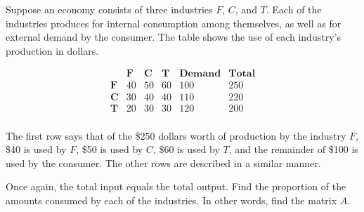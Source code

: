 \begin{example}
    Suppose an economy consists of three industries \( F \), \( C \), and \( T \). Each of the industries produces for internal consumption among themselves, as well as for external demand by the consumer. The table shows the use of each industry's production in dollars.

    \[
        \begin{array}{cccccc}
            \textbf{ } & \textbf{F} & \textbf{C} & \textbf{T} & \textbf{Demand} & \textbf{Total} \\
            \textbf{F} & 40         & 50         & 60         & 100             & 250            \\
            \textbf{C} & 30         & 40         & 40         & 110             & 220            \\
            \textbf{T} & 20         & 30         & 30         & 120             & 200            \\
        \end{array}
    \]

    The first row says that of the \$250 dollars worth of production by the industry \( F \), \$40 is used by \( F \), \$50 is used by \( C \), \$60 is used by \( T \), and the remainder of \$100 is used by the consumer. The other rows are described in a similar manner.

    Once again, the total input equals the total output. Find the proportion of the amounts consumed by each of the industries. In other words, find the matrix \( A \).
\end{example}

